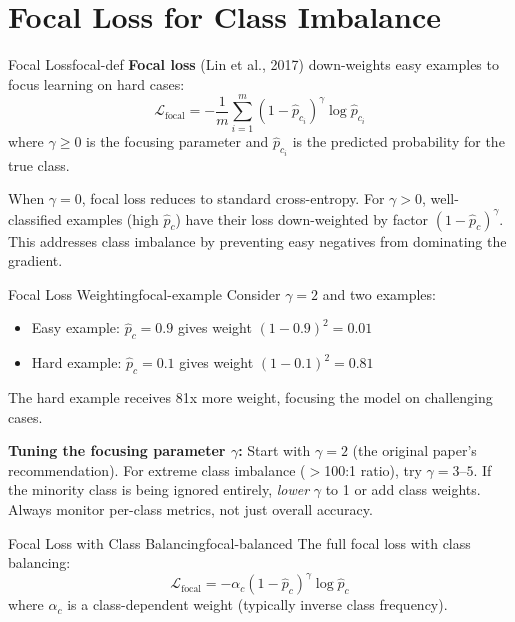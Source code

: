 \documentclass[../../main.tex]{subfiles}
\begin{document}
\section{Focal Loss for Class Imbalance}
\label{sec:focal-loss}

\begin{definition}{Focal Loss}{focal-def}
\textbf{Focal loss} (Lin et al., 2017) down-weights easy examples to focus learning on hard cases:
\[
    \mathcal{L}_{\text{focal}} = -\frac{1}{m} \sum_{i=1}^{m} (1 - \hat{p}_{c_i})^\gamma \log \hat{p}_{c_i}
\]
where $\gamma \geq 0$ is the focusing parameter and $\hat{p}_{c_i}$ is the predicted probability for the true class.
\end{definition}

\begin{intuition}
When $\gamma = 0$, focal loss reduces to standard cross-entropy. For $\gamma > 0$, well-classified examples (high $\hat{p}_c$) have their loss down-weighted by factor $(1 - \hat{p}_c)^\gamma$. This addresses class imbalance by preventing easy negatives from dominating the gradient.
\end{intuition}

\begin{example}{Focal Loss Weighting}{focal-example}
Consider $\gamma = 2$ and two examples:
\begin{itemize}
    \item Easy example: $\hat{p}_c = 0.9$ gives weight $(1-0.9)^2 = 0.01$
    \item Hard example: $\hat{p}_c = 0.1$ gives weight $(1-0.1)^2 = 0.81$
\end{itemize}
The hard example receives 81x more weight, focusing the model on challenging cases.
\end{example}

\begin{keyconcept}
\textbf{Tuning the focusing parameter $\gamma$:} Start with $\gamma=2$ (the original paper's recommendation). For extreme class imbalance ($>$100:1 ratio), try $\gamma=3$--$5$. If the minority class is being ignored entirely, \emph{lower} $\gamma$ to 1 or add class weights. Always monitor per-class metrics, not just overall accuracy.
\end{keyconcept}

\begin{definition}{Focal Loss with Class Balancing}{focal-balanced}
The full focal loss with class balancing:
\[
    \mathcal{L}_{\text{focal}} = -\alpha_c (1 - \hat{p}_c)^\gamma \log \hat{p}_c
\]
where $\alpha_c$ is a class-dependent weight (typically inverse class frequency).
\end{definition}
\end{document}
